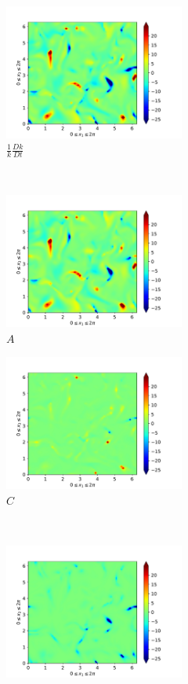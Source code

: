 \begin{figure}[H]
    \begin{subfigure}[H]{0.45\textwidth}
        \includegraphics[height=1.75in]{media/run-cds-65/ke-1340}
        \caption{$\frac{1}{k} \frac{D k}{Dt}$}
    \end{subfigure}
    ~
    \begin{subfigure}{0.45\textwidth}
        \includegraphics[height=1.75in]{media/run-cds-65/A-ke-1340}
        \caption{$A$}
    \end{subfigure}
    \newline
    \begin{subfigure}{0.45\textwidth}
        \includegraphics[height=1.75in]{media/run-cds-65/C-ke-1340}
        \caption{$C$}
    \end{subfigure}
    ~
    \begin{subfigure}{0.45\textwidth}
        \includegraphics[height=1.75in]{media/run-cds-65/P-ke-1340}

\end{subfigure}
\end{figure}
